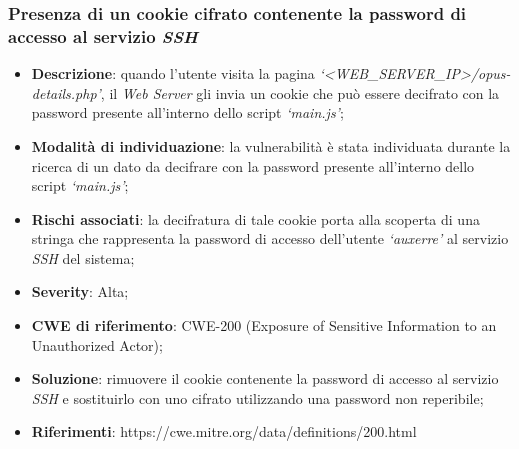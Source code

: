 \documentclass[a4paper,11pt,oneside,top=3cm,bottom=3cm,left=3.5cm,right=3.5cm,openright,reqno,table]{book}
\begin{document}
\subsubsection{Presenza di un cookie cifrato contenente la password di accesso al servizio \emph{SSH}}
\begin{itemize}
    \item \textbf{Descrizione}: quando l'utente visita la pagina \emph{`<WEB\_SERVER\_IP>/opus-details.php'}, il \emph{Web Server} gli invia un cookie che può essere decifrato con la password presente all'interno dello script \emph{`main.js'};
    \item \textbf{Modalità di individuazione}: la vulnerabilità è stata individuata durante la ricerca di un dato da decifrare con la password presente all'interno dello script \emph{`main.js'};
    \item \textbf{Rischi associati}: la decifratura di tale cookie porta alla scoperta di una stringa che rappresenta la password di accesso dell'utente \emph{`auxerre'} al servizio \emph{SSH} del sistema;
    \item \textbf{Severity}: Alta;
    \item \textbf{CWE di riferimento}: CWE-200 (Exposure of Sensitive Information to an Unauthorized Actor);
    \item \textbf{Soluzione}: rimuovere il cookie contenente la password di accesso al servizio \emph{SSH} e sostituirlo con uno cifrato utilizzando una password non reperibile;
    \item \textbf{Riferimenti}: https://cwe.mitre.org/data/definitions/200.html
\end{itemize}
\end{document}
